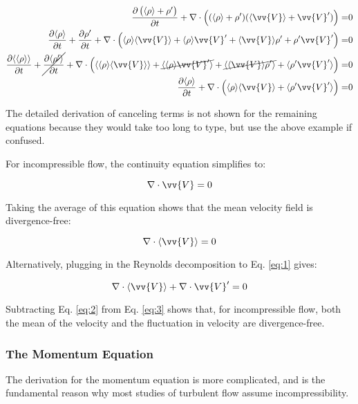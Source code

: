 \documentclass[10pt]{article}
\newcommand{\beq}{\begin{equation}}
\newcommand{\eeq}{\end{equation}}
\newcommand{\beqa}{\begin{equation}\begin{aligned}}
\newcommand{\eeqa}{\end{aligned}\end{equation}}
\newcommand{\la}{\langle}
\newcommand{\ra}{\rangle}
\newcounter{subsubsubsection}[subsubsection]
\begin{document}
\begin{flushleft}
\beqa
\frac{\partial \left(\la\rho\ra+\rho'\right)}{\partial t}+\nabla\cdot \left((\la\rho\ra+\rho')(\la\vv{V}\ra+\vv{V}')\right)=&0\\
\frac{\partial\la\rho\ra}{\partial t}+\frac{\partial\rho'}{\partial t}+\nabla\cdot \left(\la\rho\ra\la\vv{V}\ra+\la\rho\ra\vv{V}'+\la\vv{V}\ra\rho'+\rho'\vv{V}'\right)=&0\\
\frac{\partial\la\la\rho\ra\ra}{\partial t}+\cancel{\frac{\partial\la\rho'\ra}{\partial t}}+\nabla\cdot\left(\la\la\rho\ra\la\vv{V}\ra\ra+\cancel{\la\la\rho\ra\vv{V}'\ra}+\cancel{\la\la\vv{V}\ra\rho'\ra}+\la\rho'\vv{V}'\ra\right)=&0\\
\frac{\partial\la\rho\ra}{\partial t}+\nabla\cdot\left(\la\rho\ra\la\vv{V}\ra+\la\rho'\vv{V}'\ra\right)=&0\\
\eeqa

The detailed derivation of canceling terms is not shown for the remaining equations because they would take too long to type, but use the above example if confused. 


For incompressible flow, the continuity equation simplifies to:

\beq
\label{eq:1}
\nabla\cdot\vv{V}=0
\eeq

Taking the average of this equation shows that the mean velocity field is divergence-free:

\beq
\label{eq:2}
\nabla\cdot\la\vv{V}\ra=0
\eeq

Alternatively, plugging in the Reynolds decomposition to Eq. \eqref{eq:1} gives:

\beq
\label{eq:3}
\nabla\cdot\la\vv{V}\ra+\nabla\cdot\vv{V}'=0
\eeq

Subtracting Eq. \eqref{eq:2} from Eq. \eqref{eq:3} shows that, for incompressible flow, both the mean of the velocity and the fluctuation in velocity are divergence-free. 


\subsubsection{The Momentum Equation}
The derivation for the momentum equation is more complicated, and is the fundamental reason why most studies of turbulent flow assume incompressibility.


\end{flushleft}
\end{document}
